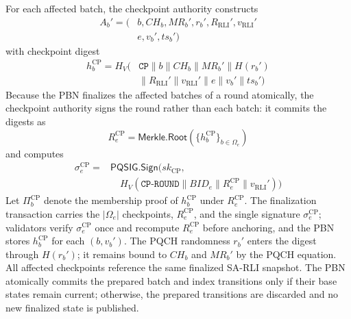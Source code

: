 \documentclass[lettersize,journal]{IEEEtran}
\begin{document}
For each affected batch, the checkpoint authority constructs
\begin{equation}
\begin{aligned}
A_b'=\big(&b,CH_b,MR_b',r_b',
R_{\mathrm{RLI}}',v_{\mathrm{RLI}}'\\
&e,v_b',ts_b'\big)
\end{aligned}
\end{equation}
with checkpoint digest
\begin{equation}
\begin{aligned}
h_b^{\mathrm{CP}}=
H_V\big(&\texttt{CP}\parallel b\parallel CH_b\parallel MR_b'
\parallel H(r_b')\\
&\parallel R_{\mathrm{RLI}}'\parallel v_{\mathrm{RLI}}'
\parallel e\parallel v_b'\parallel ts_b'\big)
\end{aligned}
\end{equation}
Because the PBN finalizes the affected batches of a round
atomically, the checkpoint authority signs the round rather than each
batch: it commits the digests as
\begin{equation}
R_e^{\mathrm{CP}}=\mathsf{Merkle.Root}(\{h_b^{\mathrm{CP}}\}_{b\in\Omega_e})
\end{equation}
and computes
\begin{equation}
\begin{aligned}
\sigma_e^{\mathrm{CP}}={}&
\mathsf{PQSIG.Sign}\big(sk_{\mathrm{CP}},\\
&\quad H_V(\texttt{CP-ROUND}\parallel BID_e\parallel R_e^{\mathrm{CP}}
\parallel v_{\mathrm{RLI}}')\big)
\end{aligned}
\end{equation}
Let $\Pi_b^{\mathrm{CP}}$ denote the membership proof of
$h_b^{\mathrm{CP}}$ under $R_e^{\mathrm{CP}}$. The finalization
transaction carries the $|\Omega_e|$ checkpoints, $R_e^{\mathrm{CP}}$, and
the single signature $\sigma_e^{\mathrm{CP}}$; validators verify
$\sigma_e^{\mathrm{CP}}$ once and recompute $R_e^{\mathrm{CP}}$ before
anchoring, and the PBN stores $h_b^{\mathrm{CP}}$ for each $(b,v_b')$. The PQCH randomness $r_b'$ enters the digest through $H(r_b')$; it remains
bound to $CH_b$ and $MR_b'$ by the PQCH equation.
All affected checkpoints reference the same finalized SA-RLI snapshot.
The PBN atomically commits the prepared batch and index transitions
only if their base states remain current; otherwise, the prepared
transitions are discarded and no new finalized state is published.
\end{document}
